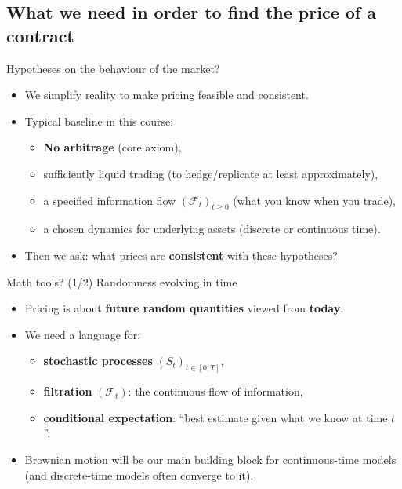 \documentclass[10pt,aspectratio=169]{beamer}
\begin{document}
\subsection{What we need in order to find the price of a contract}

\begin{frame}{Hypotheses on the behaviour of the market?}
\begin{itemize}
  \item We simplify reality to make pricing feasible and consistent.\pause 
  \item Typical baseline in this course:
  \begin{itemize}
    \item \textbf{No arbitrage} (core axiom),\pause 
    \item sufficiently liquid trading (to hedge/replicate at least approximately),\pause 
    \item a specified information flow $(\mathcal{F}_t)_{t\ge0}$ (what you know when you trade),\pause 
    \item a chosen dynamics for underlying assets (discrete or continuous time).\pause 
  \end{itemize}
  \item Then we ask: what prices are \textbf{consistent} with these hypotheses?
\end{itemize}
\end{frame}

\begin{frame}{Math tools? (1/2) Randomness evolving in time}
\begin{itemize}
  \item Pricing is about \textbf{future random quantities} viewed from \textbf{today}.\pause 
  \item We need a language for:
  \begin{itemize}
    \item \textbf{stochastic processes} $(S_t)_{t\in[0,T]}$,\pause 
    \item \textbf{filtration} $(\mathcal{F}_t)$: the continuous flow of information,\pause 
    \item \textbf{conditional expectation}: ``best estimate given what we know at time $t$''.\pause 
  \end{itemize}
  \item Brownian motion will be our main building block for continuous-time models
  (and discrete-time models often converge to it). 
\end{itemize}
\end{frame}
\end{document}
